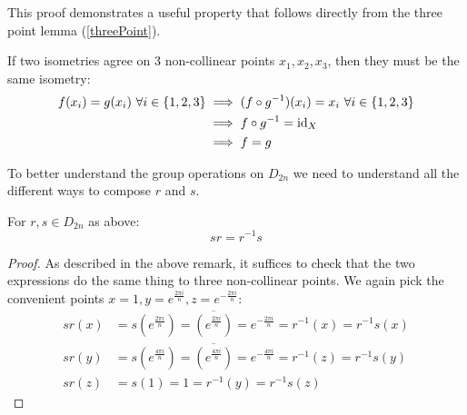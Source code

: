 \documentclass[../main.tex]{subfiles}
\begin{document}
\begin{remark}
  This proof demonstrates a useful property that follows directly from the three point lemma (\cref{threePoint}).

  If two isometries agree on 3 non-collinear points $x_1, x_2, x_3$, then they must be the same isometry:
  \begin{align*}
    f(x_i) = g(x_i)\ \forall i \in \{1, 2, 3\} &\implies (f \circ g^{-1})(x_i) = x_i\ \forall i \in \{1, 2, 3\} \\
                                               &\implies f \circ g^{-1} = \mathrm{id}_{X} \\
                                               &\implies f = g
  \end{align*}
\end{remark}
To better understand the group operations on $D_{2n}$ we need to understand all the different ways to compose $r$ and $s$.
\begin{lemma}
  For $r, s \in D_{2n}$ as above:
  \[
    sr = r^{-1}s
  \]
\end{lemma}
\begin{proof}
  As described in the above remark, it suffices to check that the two expressions do the same thing to three non-collinear points.
  We again pick the convenient points $x = 1, y = e^{\frac{2\pi i}{n}}, z = e^{-\frac{2\pi i}{n}}$:
  \begin{align*}
    sr(x) &= s\left(e^{\frac{2\pi i}{n}}\right) = \overline{\left(e^{\frac{2\pi i }{n}}\right)} = e^{-\frac{2\pi i}{n}} = r^{-1}(x) = r^{-1}s(x) \\
    sr(y) &= s\left(e^{\frac{4\pi i}{n}}\right) = \overline{\left(e^{\frac{4\pi i }{n}}\right)} = e^{-\frac{4\pi i}{n}} = r^{-1}(z) = r^{-1}s(y) \\
    sr(z) &= s(1) = 1 =  r^{-1}(y) = r^{-1}s(z)
  \end{align*}
\end{proof}
\end{document}

